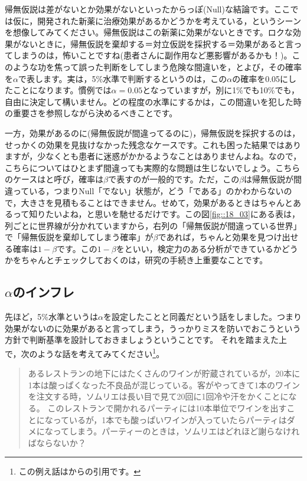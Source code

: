 \documentclass{ltjsbook}
\begin{document}
帰無仮説は差がないとか効果がないといったからっぽ(Null)な結論です。ここでは仮に，開発された新薬に治療効果があるかどうかを考えている，というシーンを想像してみてください。帰無仮説はこの新薬に効果がないときです。ロクな効果がないときに，帰無仮説を棄却する＝対立仮説を採択する＝効果があると言ってしまうのは，怖いことですね(患者さんに副作用など悪影響があるかも！)。このような功を焦って誤った判断をしてしまう危険な間違いを，とよび，その確率を$\alpha$で表します。実は，5\%水準で判断するというのは，この$\alpha$の確率を0.05にしたことになります。慣例では$\alpha=0.05$となっていますが，別に1\%でも10\%でも，自由に決定して構いません。どの程度の水準にするかは，この間違いを犯した時の重要さを参照しながら決めるべきことです。

一方，効果があるのに(帰無仮説が間違ってるのに)，帰無仮説を採択するのは，せっかくの効果を見抜けなかった残念なケースです。これも困った結果ではありますが，少なくとも患者に迷惑がかかるようなことはありませんよね。なので，こちらについてはひとまず間違っても実際的な問題は生じないでしょう。こちらのケースはと呼び，確率は$\beta$で表すのが一般的です。ただ，この$\beta$は帰無仮説が間違っている，つまりNull「でない」状態が，どう「である」のかわからないので，大きさを見積もることはできません。せめて，効果があるときはちゃんとあるって知りたいよね，と思いを馳せるだけです。この図\ref{fig::18_03}にある表は，列ごとに世界線が分かれていますから，右列の「帰無仮説が間違っている世界」で「帰無仮説を棄却してしまう確率」が$\beta$であれば，ちゃんと効果を見つけ出せる確率は$1-\beta$です。この$1-\beta$をといい，検定力のある分析ができているかどうかをちゃんとチェックしておくのは，研究の手続き上重要なことです。

\subsection{$\alpha$のインフレ}
\label{alphaInfration}
先ほど，5\%水準というは$\alpha$を設定したことと同義だという話をしました。つまり効果がないのに効果があると言ってしまう，うっかりミスを防いでおこうという方針で判断基準を設計しておきましょうということです。
それを踏まえた上で，次のような話を考えてみてください\footnote{この例え話は\textcite{BA33892274}からの引用です。}。
\begin{quote}
	あるレストランの地下にはたくさんのワインが貯蔵されているが，20本に1本は酸っぱくなった不良品が混じっている。客がやってきて1本のワインを注文する時，ソムリエは長い目で見て20回に1回冷や汗をかくことになる。
	このレストランで開かれるパーティには10本単位でワインを出すことになっているが，1本でも酸っぱいワインが入っていたらパーティはダメになってしまう。パーティーのときは，ソムリエはどれほど謝らなければならないか？
\end{quote}
\end{document}
